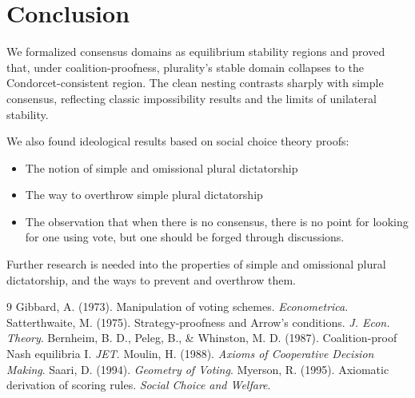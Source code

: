 \documentclass{article}
\begin{document}
\section{Conclusion}
We formalized consensus domains as equilibrium stability regions and proved that, under coalition-proofness, plurality’s stable domain collapses to the Condorcet-consistent region. The clean nesting contrasts sharply with simple consensus, reflecting classic impossibility results and the limits of unilateral stability.

We also found ideological results based on social choice theory proofs:

\begin{itemize}
    \item The notion of simple and omissional plural dictatorship
    \item The way to overthrow simple plural dictatorship
    \item The observation that when there is no consensus, there is no point for looking for one using vote, but one should be forged through discussions.
\end{itemize}

Further research is needed into the properties of simple and omissional plural dictatorship, and the ways to prevent and overthrow them.


\begin{thebibliography}{9}
 Gibbard, A. (1973). Manipulation of voting schemes. \textit{Econometrica}.
 Satterthwaite, M. (1975). Strategy-proofness and Arrow’s conditions. \textit{J. Econ. Theory}.
 Bernheim, B. D., Peleg, B., \& Whinston, M. D. (1987). Coalition-proof Nash equilibria I. \textit{JET}.
 Moulin, H. (1988). \textit{Axioms of Cooperative Decision Making}.
 Saari, D. (1994). \textit{Geometry of Voting}.
 Myerson, R. (1995). Axiomatic derivation of scoring rules. \textit{Social Choice and Welfare}.
\end{thebibliography}
\end{document}
